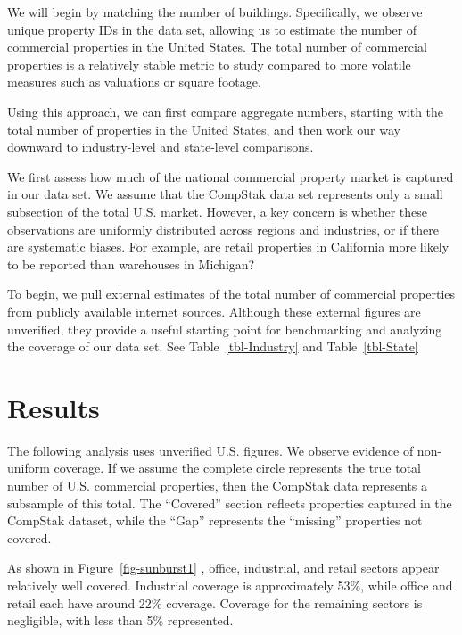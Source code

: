\documentclass[
  12pt]{article}
\begin{document}
We will begin by matching the number of buildings. Specifically, we
observe unique property IDs in the data set, allowing us to estimate the
number of commercial properties in the United States. The total number
of commercial properties is a relatively stable metric to study compared
to more volatile measures such as valuations or square footage.

Using this approach, we can first compare aggregate numbers, starting
with the total number of properties in the United States, and then work
our way downward to industry-level and state-level comparisons.

We first assess how much of the national commercial property market is
captured in our data set. We assume that the CompStak data set
represents only a small subsection of the total U.S. market. However, a
key concern is whether these observations are uniformly distributed
across regions and industries, or if there are systematic biases. For
example, are retail properties in California more likely to be reported
than warehouses in Michigan?

To begin, we pull external estimates of the total number of commercial
properties from publicly available internet sources. Although these
external figures are unverified, they provide a useful starting point
for benchmarking and analyzing the coverage of our data set. See
Table~\ref{tbl-Industry} and Table~\ref{tbl-State}

\section{Results}\label{results}

The following analysis uses unverified U.S. figures. We observe evidence
of non-uniform coverage. If we assume the complete circle represents the
true total number of U.S. commercial properties, then the CompStak data
represents a subsample of this total. The ``Covered'' section reflects
properties captured in the CompStak dataset, while the ``Gap''
represents the ``missing'' properties not covered.

As shown in Figure~\ref{fig-sunburst1} , office, industrial, and retail
sectors appear relatively well covered. Industrial coverage is
approximately 53\%, while office and retail each have around 22\%
coverage. Coverage for the remaining sectors is negligible, with less
than 5\% represented.
\end{document}
